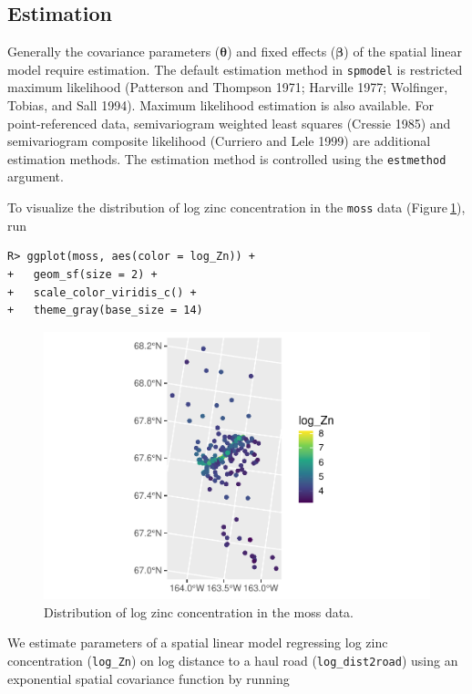 \documentclass{article}
\begin{document}
\hypertarget{estimation}{%
\subsection{Estimation}\label{estimation}}

Generally the covariance parameters (\(\boldsymbol{\theta}\)) and fixed
effects (\(\boldsymbol{\beta}\)) of the spatial linear model require
estimation. The default estimation method in \texttt{spmodel} is
restricted maximum likelihood (Patterson and Thompson 1971; Harville
1977; Wolfinger, Tobias, and Sall 1994). Maximum likelihood estimation
is also available. For point-referenced data, semivariogram weighted
least squares (Cressie 1985) and semivariogram composite likelihood
(Curriero and Lele 1999) are additional estimation methods. The
estimation method is controlled using the \texttt{estmethod} argument.

To visualize the distribution of log zinc concentration in the
\texttt{moss} data (Figure\(~\)\ref{fig:log_zn}), run

\begin{verbatim}
R> ggplot(moss, aes(color = log_Zn)) +
+   geom_sf(size = 2) +
+   scale_color_viridis_c() +
+   theme_gray(base_size = 14)
\end{verbatim}

\begin{figure}

{\centering \includegraphics[width=0.65\linewidth]{preprint_files/figure-latex/log_zn-1} 

}

\caption{Distribution of log zinc concentration in the moss data.}\label{fig:log_zn}
\end{figure}

We estimate parameters of a spatial linear model regressing log zinc
concentration (\texttt{log\_Zn}) on log distance to a haul road
(\texttt{log\_dist2road}) using an exponential spatial covariance
function by running
\end{document}
